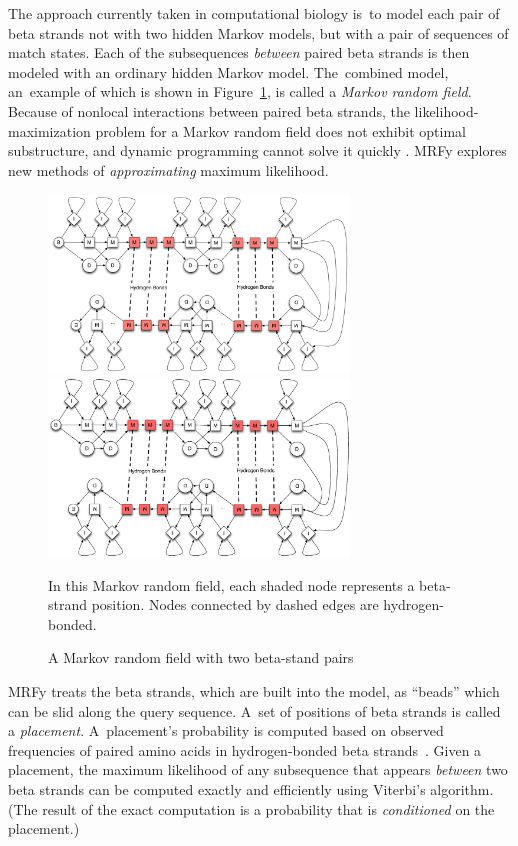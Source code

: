 \documentclass[preprint,nonatbib,blockstyle,nocopyrightspace,times]{sigplanconf}
\newcommand\figref[1]{Figure~\ref{#1}}
\let\cite\citep
\begin{document}
The approach currently taken in computational biology
is~to model each pair of beta strands not with two hidden Markov
models, 
but with a pair of sequences of match states.
Each of the subsequences \emph{between} paired beta strands is then
modeled with an ordinary hidden Markov model.
The~combined model, an~example of which is shown in \figref{mrf}, is called a
\textit{Markov random field}. 
Because of nonlocal interactions between paired beta strands, 
the likelihood-maximization problem for a Markov random field does not
 exhibit optimal substructure, and dynamic
 programming cannot solve it quickly \cite{Menke:2010ti,Daniels:2012}.
MRFy explores new methods of \emph{approximating}
maximum likelihood.


\begin{figure}
\ifpdfmadness
\centerline{\includegraphics[width=8cm]{mrf_interleave_diagram.pdf}} 
\else
\centerline{\includegraphics[width=8cm]{mrf_interleave_diagram.eps}} 
\fi
In this Markov random field,
each shaded node represents a beta-strand position.
Nodes connected by dashed edges are hydrogen-bonded.

\caption{A Markov random field with two beta-stand pairs}
\label{mrf} 
\end{figure}



MRFy treats the beta 
strands, which are built into the model,
 as ``beads'' which can be slid along the query sequence.
A~set of positions of beta strands is called
 a \emph{placement}.
A~placement's probability is computed
based on observed frequencies of paired amino acids in 
hydrogen-bonded beta strands~\cite{Cowen:2002p588}.
Given a placement, the maximum likelihood of any subsequence that appears
\emph{between} two beta strands can be computed exactly and
efficiently using Viterbi's algorithm.
(The result of the exact computation is a probability that is
\emph{conditioned} on the placement.)
\end{document}
